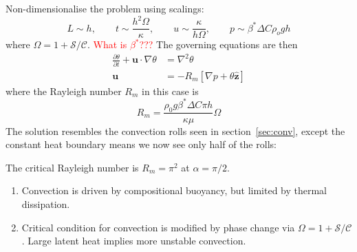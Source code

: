 \documentclass{jknotes}
\renewcommand{\u}{\symbf{u}}
\newcommand{\C}{\mathcal{C}}
\renewcommand{\S}{\mathcal{S}}
\begin{document}
Non-dimensionalise the problem using scalings:
\begin{equation}
	L \sim h, \hspace{2em} t \sim \frac{h^2 \Omega}{\kappa},\hspace{2em} u \sim
	\frac{\kappa}{h\Omega},\hspace{2em} p \sim \beta^* \Delta C \rho_o g h
\end{equation}
where $\Omega = 1 + \S/\C$. \textcolor{red}{What is $\beta^*$???} The
governing equations are then
\begin{align}
	\frac{\partial \theta}{\partial t} + \u \cdot \nabla \theta &= \nabla^2
	\theta \\
	\u &= -R_m \left[ \nabla p + \theta \hat{\symbf{z}}\right] 
\end{align}
where the Rayleigh number $R_m$ in this case is
\begin{equation}
	R_m = \frac{\rho_0 g \beta^* \Delta C \pi h}{\kappa \mu} \Omega
\end{equation}
The solution resembles the convection rolls seen in section~\ref{sec:conv},
except the constant heat boundary means we now see only half of the rolls:

\begin{center}
\end{center}

The critical Rayleigh number is $R_m = \pi^2$ at $\alpha = \pi/2$.
\begin{enumerate}
	\item Convection is driven by compositional buoyancy, but limited by
		thermal dissipation.
	\item Critical condition for convection is modified by phase change via
		$\Omega = 1+\S/\C$. Large latent heat implies more unstable
		convection.
\end{enumerate}
\end{document}
